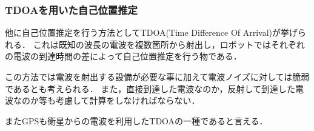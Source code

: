 \subsubsection{TDOAを用いた自己位置推定}
\label{tdoa_problem}
他に自己位置推定を行う方法としてTDOA(Time Difference Of Arrival)が挙げられる．
これは既知の波長の電波を複数箇所から射出し，ロボットではそれぞれの電波の到達時間の差によって自己位置推定を行う物である．

この方法では電波を射出する設備が必要な事に加えて電波ノイズに対しては脆弱であるとも考えられる．
また，直接到達した電波なのか，反射して到達した電波なのか等も考慮して計算をしなければならない．

またGPSも衛星からの電波を利用したTDOAの一種であると言える．